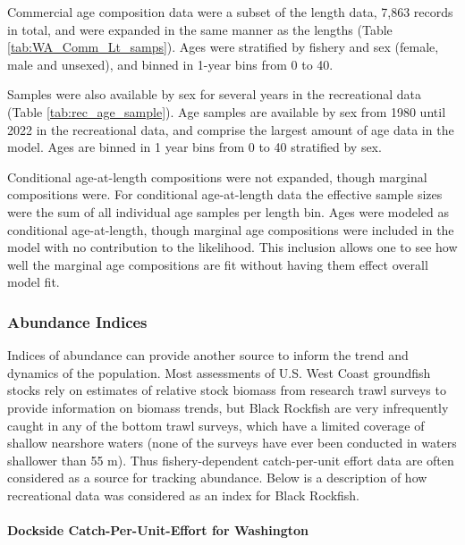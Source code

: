 \documentclass[11pt,
  english,
  letterpaper,
]{article}
\begin{document}
Commercial age composition data were a subset of the length data, 7,863 records in total, and were expanded in the same manner as the lengths (Table \ref{tab:WA_Comm_Lt_samps}). Ages were stratified by fishery and sex (female, male and unsexed), and binned in 1-year bins from 0 to 40.

Samples were also available by sex for several years in the recreational data (Table \ref{tab:rec_age_sample}). Age samples are available by sex from 1980 until 2022 in the recreational data, and comprise the largest amount of age data in the model. Ages are binned in 1 year bins from 0 to 40 stratified by sex.

Conditional age-at-length compositions were not expanded, though marginal compositions were. For conditional age-at-length data the effective sample sizes were the sum of all individual age samples per length bin. Ages were modeled as conditional age-at-length, though marginal age compositions were included in the model with no contribution to the likelihood. This inclusion allows one to see how well the marginal age compositions are fit without having them effect overall model fit.

\hypertarget{abundance-indices}{%
\subsubsection{Abundance Indices}\label{abundance-indices}}

Indices of abundance can provide another source to inform the trend and dynamics of the population. Most assessments of U.S. West Coast groundfish stocks rely on estimates of relative stock biomass from research trawl surveys to provide information on biomass trends, but Black Rockfish are very infrequently caught in any of the bottom trawl surveys, which have a limited coverage of shallow nearshore waters (none of the surveys have ever been conducted in waters shallower than 55 m). Thus fishery-dependent catch-per-unit effort data are often considered as a source for tracking abundance. Below is a description of how recreational data was considered as an index for Black Rockfish.

\hypertarget{dockside-catch-per-unit-effort-for-washington}{%
\paragraph{Dockside Catch-Per-Unit-Effort for Washington}\label{dockside-catch-per-unit-effort-for-washington}}
\end{document}
